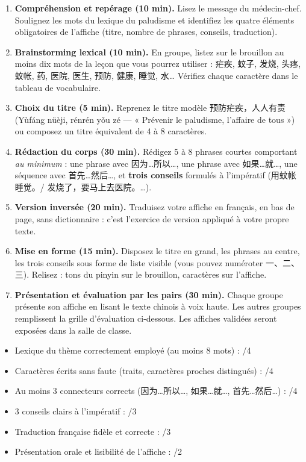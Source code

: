 \documentclass[11pt]{article}
\begin{document}
\begin{enumerate}
\item \textbf{Compréhension et repérage (10 min).} Lisez le message du médecin-chef. Soulignez les mots du lexique du paludisme et identifiez les quatre éléments obligatoires de l'affiche (titre, nombre de phrases, conseils, traduction).
\item \textbf{Brainstorming lexical (10 min).} En groupe, listez sur le brouillon au moins dix mots de la leçon que vous pourrez utiliser : 疟疾, 蚊子, 发烧, 头疼, 蚊帐, 药, 医院, 医生, 预防, 健康, 睡觉, 水… Vérifiez chaque caractère dans le tableau de vocabulaire.
\item \textbf{Choix du titre (5 min).} Reprenez le titre modèle 预防疟疾，人人有责 (Yùfáng nüèji, rénrén yǒu zé — « Prévenir le paludisme, l'affaire de tous ») ou composez un titre équivalent de 4 à 8 caractères.
\item \textbf{Rédaction du corps (30 min).} Rédigez 5 à 8 phrases courtes comportant \emph{au minimum} : une phrase avec 因为…所以…, une phrase avec 如果…就…, une séquence avec 首先…然后…, et \textbf{trois conseils} formulés à l'impératif (用蚊帐睡觉。/ 发烧了，要马上去医院。…).
\item \textbf{Version inversée (20 min).} Traduisez votre affiche en français, en bas de page, sans dictionnaire : c'est l'exercice de version appliqué à votre propre texte.
\item \textbf{Mise en forme (15 min).} Disposez le titre en grand, les phrases au centre, les trois conseils sous forme de liste visible (vous pouvez numéroter 一、二、三). Relisez : tons du pinyin sur le brouillon, caractères sur l'affiche.
\item \textbf{Présentation et évaluation par les pairs (30 min).} Chaque groupe présente son affiche en lisant le texte chinois à voix haute. Les autres groupes remplissent la grille d'évaluation ci-dessous. Les affiches validées seront exposées dans la salle de classe.
\end{enumerate}

\begin{attention}
\begin{itemize}
\item Lexique du thème correctement employé (au moins 8 mots) : /4
\item Caractères écrits sans faute (traits, caractères proches distingués) : /4
\item Au moins 3 connecteurs corrects (因为…所以…, 如果…就…, 首先…然后…) : /4
\item 3 conseils clairs à l'impératif : /3
\item Traduction française fidèle et correcte : /3
\item Présentation orale et lisibilité de l'affiche : /2
\end{itemize}
\end{attention}
\end{document}
